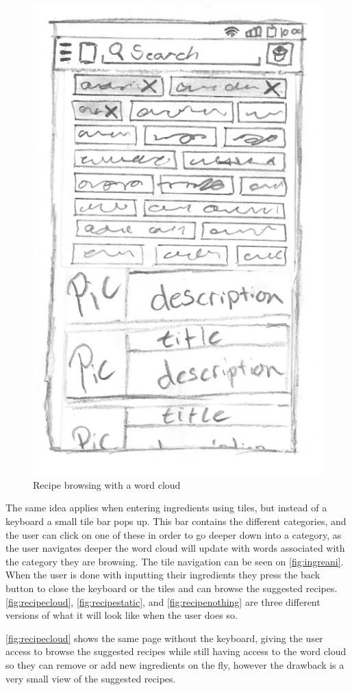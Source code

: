 \begin{figure}[H]
\begin{minipage}[b]{0.5\columnwidth}
\includegraphics[width=0.7\columnwidth]{img/prototypes/recipe_browse.pdf}
\caption{Recipe browsing with a word cloud\label{fig:recipecloud}}
\end{minipage}
\end{figure}

The same idea applies when entering ingredients using tiles, but instead of a keyboard a small tile bar pops up. This bar contains the different categories, and the user can click on one of these in order to go deeper down into a category, as the user navigates deeper the word cloud will update with words associated with the category they are browsing. The tile navigation can be seen on \autoref{fig:ingreani}. When the user is done with inputting their ingredients they press the back button to close the keyboard or the tiles and can browse the suggested recipes. \autoref{fig:recipecloud}, \autoref{fig:recipestatic}, and \autoref{fig:recipenothing} are three different versions of what it will look like when the user does so.

\autoref{fig:recipecloud} shows the same page without the keyboard, giving the user access to browse the suggested recipes while still having access to the word cloud so they can remove or add new ingredients on the fly, however the drawback is a very small view of the suggested recipes. 

